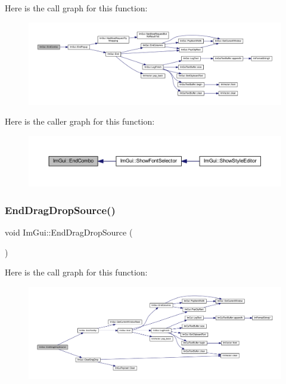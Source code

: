 Here is the call graph for this function\+:
\nopagebreak
\begin{figure}[H]
\begin{center}
\leavevmode
\includegraphics[width=350pt]{namespace_im_gui_a63434692d7de278875c7ea0143fbe6e4_cgraph}
\end{center}
\end{figure}
Here is the caller graph for this function\+:
\nopagebreak
\begin{figure}[H]
\begin{center}
\leavevmode
\includegraphics[width=350pt]{namespace_im_gui_a63434692d7de278875c7ea0143fbe6e4_icgraph}
\end{center}
\end{figure}
\mbox{\label{namespace_im_gui_a02f225fefff2a046038ed99ab20606da}} 
\subsubsection{\texorpdfstring{End\+Drag\+Drop\+Source()}{EndDragDropSource()}}
{\footnotesize\ttfamily void Im\+Gui\+::\+End\+Drag\+Drop\+Source (\begin{DoxyParamCaption}{ }\end{DoxyParamCaption})}

Here is the call graph for this function\+:
\nopagebreak
\begin{figure}[H]
\begin{center}
\leavevmode
\includegraphics[width=350pt]{namespace_im_gui_a02f225fefff2a046038ed99ab20606da_cgraph}
\end{center}
\end{figure}
\mbox{\label{namespace_im_gui_ae8313266214728f86c2cb7cb30a30e89}} 

